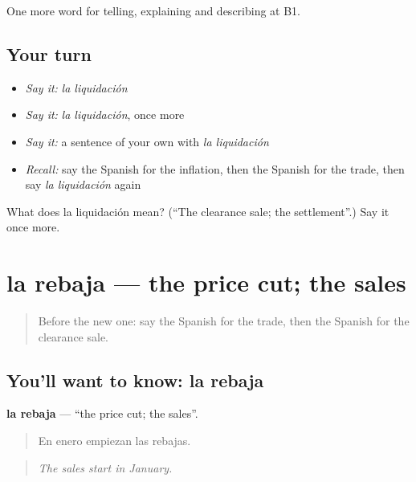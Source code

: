 \begin{grammarlens}[title={What you've built}]
One more word for telling, explaining and describing at B1.
\end{grammarlens}

\subsection*{Your turn}
\begin{itemize}
\raggedright
  \item \emph{Say it:} \emph{la liquidación}
  \item \emph{Say it:} \emph{la liquidación}, once more
  \item \emph{Say it:} a sentence of your own with \emph{la liquidación}
  \item \emph{Recall:} say the Spanish for the inflation, then the Spanish for the trade, then say \emph{la liquidación} again
\end{itemize}

\begin{tcolorbox}[breakable,colback=teal!4,colframe=teal!35!black,title={Before you move on}]
What does la liquidación mean? (\textquotedblleft{}The clearance sale; the settlement\textquotedblright{}.) Say it once more.
\end{tcolorbox}
\section[la rebaja]{la rebaja — the price cut; the sales}

\label{lesson:ES-C631-rebaja}



\begin{quote}
Before the new one: say the Spanish for the trade, then the Spanish for the clearance sale.
\end{quote}

\subsection*{You'll want to know: la rebaja}
\textbf{la rebaja} — \textquotedblleft{}the price cut; the sales\textquotedblright{}.

\begin{quote}
En enero empiezan las rebajas.
\end{quote}

\begin{quote}
\emph{The sales start in January.}
\end{quote}

